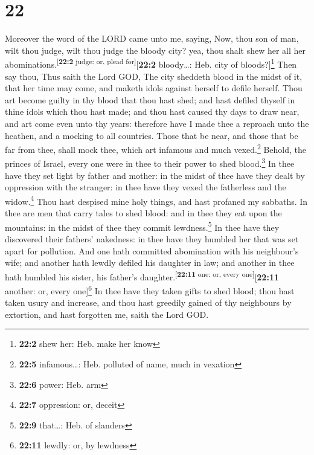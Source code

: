 \hypertarget{section-21}{%
\section{22}\label{section-21}}

 Moreover the word of the LORD came unto me, saying,
 Now, thou son of man, wilt thou judge, wilt thou judge
the bloody city? yea, thou shalt shew her all her
abominations.\textsuperscript{{[}\textbf{22:2} judge: or, plead
for{]}}{[}\textbf{22:2} bloody\ldots: Heb. city of bloods?{]}\footnote{\textbf{22:2}
  shew her: Heb. make her know}  Then say thou, Thus saith
the Lord GOD, The city sheddeth blood in the midst of it, that her time
may come, and maketh idols against herself to defile herself.
 Thou art become guilty in thy blood that thou hast shed;
and hast defiled thyself in thine idols which thou hast made; and thou
hast caused thy days to draw near, and art come even unto thy years:
therefore have I made thee a reproach unto the heathen, and a mocking to
all countries.  Those that be near, and those that be far
from thee, shall mock thee, which art infamous and much
vexed.\footnote{\textbf{22:5} infamous\ldots: Heb. polluted of name,
  much in vexation}  Behold, the princes of Israel, every
one were in thee to their power to shed blood.\footnote{\textbf{22:6}
  power: Heb. arm}  In thee have they set light by father
and mother: in the midst of thee have they dealt by oppression with the
stranger: in thee have they vexed the fatherless and the
widow.\footnote{\textbf{22:7} oppression: or, deceit} 
Thou hast despised mine holy things, and hast profaned my sabbaths.
 In thee are men that carry tales to shed blood: and in
thee they eat upon the mountains: in the midst of thee they commit
lewdness.\footnote{\textbf{22:9} that\ldots: Heb. of slanders}
 In thee have they discovered their fathers' nakedness:
in thee have they humbled her that was set apart for pollution.
 And one hath committed abomination with his neighbour's
wife; and another hath lewdly defiled his daughter in law; and another
in thee hath humbled his sister, his father's
daughter.\textsuperscript{{[}\textbf{22:11} one: or, every
one{]}}{[}\textbf{22:11} another: or, every one{]}\footnote{\textbf{22:11}
  lewdly: or, by lewdness}  In thee have they taken gifts
to shed blood; thou hast taken usury and increase, and thou hast
greedily gained of thy neighbours by extortion, and hast forgotten me,
saith the Lord GOD.

